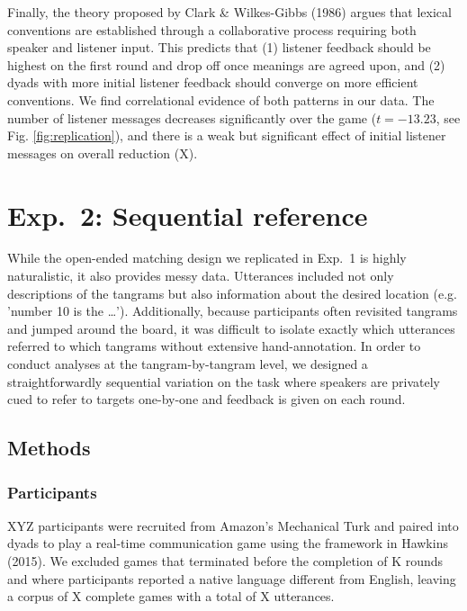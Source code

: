 \documentclass[manuscript]{stjour}
\begin{document}
Finally, the theory proposed by Clark \& Wilkes-Gibbs (1986) argues that
lexical conventions are established through a collaborative process
requiring both speaker and listener input. This predicts that (1)
listener feedback should be highest on the first round and drop off once
meanings are agreed upon, and (2) dyads with more initial listener
feedback should converge on more efficient conventions. We find
correlational evidence of both patterns in our data. The number of
listener messages decreases significantly over the game (\(t = -13.23\),
see Fig. \ref{fig:replication}), and there is a weak but significant
effect of initial listener messages on overall reduction (X).

\section{Exp.~2: Sequential reference}\label{task2}

While the open-ended matching design we replicated in Exp.~1 is highly naturalistic, it also provides messy data. Utterances included not only descriptions of the tangrams but also information about the desired location (e.g. 'number 10 is the \dots'). Additionally, because participants often revisited tangrams and jumped around the board, it was difficult to isolate exactly which utterances referred to which tangrams without extensive hand-annotation. In order to conduct analyses at the tangram-by-tangram level, we designed a straightforwardly sequential variation on the task where speakers are privately cued to refer to targets one-by-one and feedback is given on each round. 

\subsection{Methods}\label{methods}

\subsubsection{Participants}\label{participants}

XYZ participants were recruited from Amazon's Mechanical Turk and paired
into dyads to play a real-time communication game using the framework in
Hawkins (2015). We excluded games that terminated before the completion
of K rounds and where participants reported a native language different
from English, leaving a corpus of X complete games with a total of
X utterances.
\end{document}
